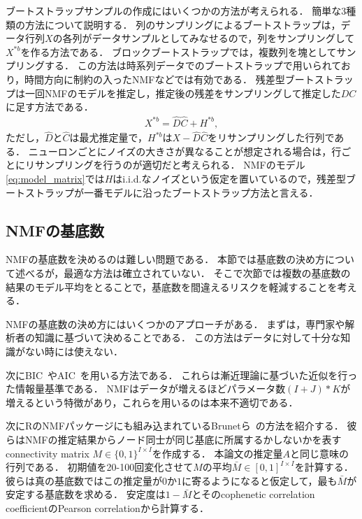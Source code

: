 ブートストラップサンプルの作成にはいくつかの方法が考えられる．
簡単な3種類の方法について説明する．
列のサンプリングによるブートストラップは，データ行列$X$の各列がデータサンプルとしてみなせるので，列をサンプリングして$X^{*b}$を作る方法である．
ブロックブートストラップでは，複数列を塊としてサンプリングする．
この方法は時系列データでのブートストラップで用いられており，時間方向に制約の入ったNMFなどでは有効である．
残差型ブートストラップは一回NMFのモデルを推定し，推定後の残差をサンプリングして推定した$DC$に足す方法である．
\begin{align}
	X^{*b} = \hat{D} \hat{C} + H^{*b},
\end{align}
ただし，$\hat{D}$と$\hat{C}$は最尤推定量で，$H^{*b}$は$X - \hat{D}\hat{C}$をリサンプリングした行列である．
ニューロンごとにノイズの大きさが異なることが想定される場合は，行ごとにリサンプリングを行うのが適切だと考えられる．
NMFのモデル\eqref{eq:model_matrix}では$H$はi.i.d.なノイズという仮定を置いているので，残差型ブートストラップが一番モデルに沿ったブートストラップ方法と言える．

\subsection{NMFの基底数}
NMFの基底数を決めるのは難しい問題である．
本節では基底数の決め方について述べるが，最適な方法は確立されていない．
そこで次節では複数の基底数の結果のモデル平均をとることで，基底数を間違えるリスクを軽減することを考える．

NMFの基底数の決め方にはいくつかのアプローチがある．
まずは，専門家や解析者の知識に基づいて決めることである．
この方法はデータに対して十分な知識がない時には使えない．

次にBIC~\cite{wasserman2000a}やAIC~\cite{Akaike1974}を用いる方法である．
これらは漸近理論に基づいた近似を行った情報量基準である．
NMFはデータが増えるほどパラメータ数$(I + J) * K$が増えるという特徴があり，これらを用いるのは本来不適切である．

次にRのNMFパッケージにも組み込まれているBrunetら~\cite{Brunet2004}の方法を紹介する．
彼らはNMFの推定結果からノード同士が同じ基底に所属するかしないかを表すconnectivity matrix $M \in \{0, 1\}^{I \times I}$を作成する．
本論文の推定量$A$と同じ意味の行列である．
初期値を20-100回変化させて$M$の平均$\bar{M} \in [0, 1]^{I \times I}$を計算する．
彼らは真の基底数ではこの推定量が$0$か$1$に寄るようになると仮定して，最も$\bar{M}$が安定する基底数を求める．
安定度は$1- \bar{M}$とそのcophenetic correlation coefficientのPearson correlationから計算する．

